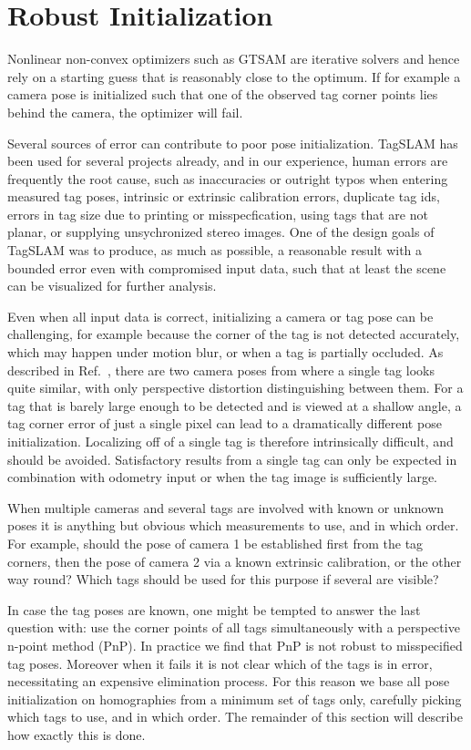 \section{Robust Initialization}
\label{sec:robustinit}
Nonlinear non-convex optimizers such as GTSAM \cite{kaess2011} are
iterative solvers and hence rely on a starting guess that is
reasonably close to the optimum. If for example a camera pose is
initialized such that one of the observed tag corner points lies
behind the camera, the optimizer will fail.

Several sources of error can contribute to poor pose
initialization. TagSLAM has been used for several projects already,
and in our experience, human errors are frequently the root cause,
such as inaccuracies or outright typos when entering measured tag
poses, intrinsic or extrinsic calibration errors, duplicate tag ids,
errors in tag size due to printing or misspecfication, using tags that
are not planar, or supplying unsychronized stereo images. One of the
design goals of TagSLAM was to produce, as much as possible, a
reasonable result with a bounded error even with compromised input
data, such that at least the scene can be visualized for further
analysis.

Even when all input data is correct, initializing a camera or tag pose
can be challenging, for example because the corner of the tag is not
detected accurately, which may happen under motion blur, or when a tag
is partially occluded.  As described in Ref.\ \cite{jin2017}, there
are two camera poses from where a single tag looks quite similar, with
only perspective distortion distinguishing between them. For a tag
that is barely large enough to be detected and is viewed at a shallow
angle, a tag corner error of just a single pixel can lead to a
dramatically different pose initialization. Localizing off of a single
tag is therefore intrinsically difficult, and should be
avoided. Satisfactory results from a single tag can only be expected
in combination with odometry input or when the tag image is
sufficiently large.

When multiple cameras and several tags are involved with known or
unknown poses it is anything but obvious which measurements to use,
and in which order.  For example, should the pose of camera 1 be
established first from the tag corners, then the pose of camera 2 via
a known extrinsic calibration, or the other way round? Which tags
should be used for this purpose if several are visible?

In case the tag poses are known, one might be tempted to answer the
last question with: use the corner points of all tags simultaneously
with a perspective n-point method \cite{fischler1981} (PnP). In
practice we find that PnP is not robust to misspecified tag
poses. Moreover when it fails it is not clear which of the tags is in
error, necessitating an expensive elimination process. For this reason
we base all pose initialization on homographies \cite{ma2003} from a
minimum set of tags only, carefully picking which tags to use, and in
which order. The remainder of this section will describe how exactly
this is done.

